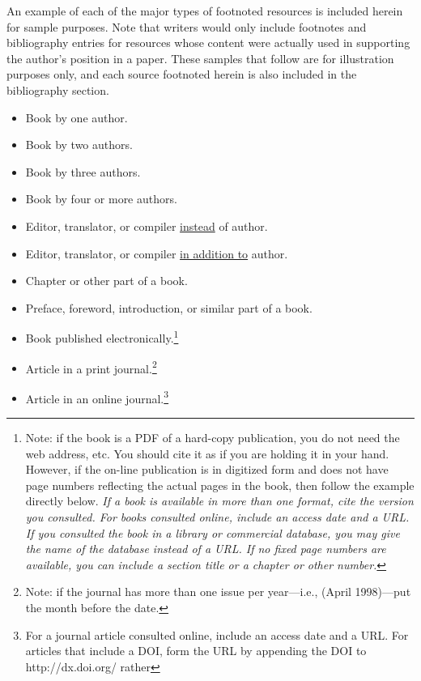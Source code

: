 \documentclass[raggedright]{turabian-researchpaper}
\begin{document}
An example of each of the major types of footnoted resources is included herein
for sample purposes. Note that writers would only include footnotes and
bibliography entries for resources whose content were actually used in
supporting the author's position in a paper. These samples that follow are for
illustration purposes only, and each source footnoted herein is also included in
the bibliography section.
\begin{itemize}
\item Book by one author.\autocite[65]{Doniger}
\item Book by two authors.\autocite[104--7]{Cowlishaw}
\item Book by three authors.\autocite[11-12]{Owenby}
\item Book by four or more authors.\autocite[262]{Laumann}
\item Editor, translator, or compiler \ul{instead} of
  author.\autocite[91--92]{Lattimore}
\item Editor, translator, or compiler \ul{in addition to}
  author.\autocite[22]{Bonnefoy}
\item Chapter or other part of a book.\autocite[101--2]{Wiese}
\item Preface, foreword, introduction, or similar part of a
  book.\autocite[xx--xxi]{Rieger}
\item Book published electronically.\autocite{Kurland}\footnote{Note: if the
  book is a PDF of a hard-copy publication, you do not need the web address,
  etc. You should cite it as if you are holding it in your hand. However, if the
  on-line publication is in digitized form and does not have page numbers
  reflecting the actual pages in the book, then follow the example directly
  below. \emph{If a book is available in more than one format, cite the version
  you consulted. For books consulted online, include an access date and a URL.
  If you consulted the book in a library or commercial database, you may give
  the name of the database instead of a URL. If no fixed page numbers are
  available, you can include a section title or a chapter or other number.}}
\item Article in a print journal.\autocite[639]{Smith}\footnote{Note: if the
  journal has more than one issue per year---i.e., (April 1998)---put the month
  before the date.}
\item Article in an online journal.\autocite{Hlatky}\footnote{For a journal
  article consulted online, include an access date and a URL. For articles that
  include a DOI, form the URL by appending the DOI to http://dx.doi.org/ rather
}
\end{itemize}
\end{document}
